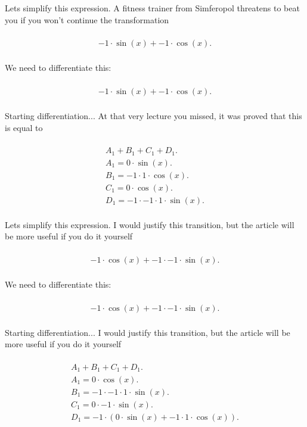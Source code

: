 \documentclass[12pt,a4paper]{extreport}
\begin{document}
Lets simplify this expression.
A fitness trainer from Simferopol\cite{SJ} threatens to beat you if you won't continue the transformation 

\begin{multline}
\\
-1 \cdot \sin(x) + -1 \cdot \cos(x).\\
\end{multline}


We need to differentiate this:


\begin{multline}
\\
-1 \cdot \sin(x) + -1 \cdot \cos(x).\\
\end{multline}


Starting differentiation... 
At that very lecture you missed, it was proved that this is equal to 

\begin{multline}
\\
A_{1} + B_{1} + C_{1} + D_{1}.\\
A_{1} = 0 \cdot \sin(x).\\
B_{1} = -1 \cdot 1 \cdot \cos(x).\\
C_{1} = 0 \cdot \cos(x).\\
D_{1} = -1 \cdot -1 \cdot 1 \cdot \sin(x).\\
\end{multline}


Lets simplify this expression.
I would justify this transition, but the article will be more useful if you do it yourself 

\begin{multline}
\\
-1 \cdot \cos(x) + -1 \cdot -1 \cdot \sin(x).\\
\end{multline}


We need to differentiate this:


\begin{multline}
\\
-1 \cdot \cos(x) + -1 \cdot -1 \cdot \sin(x).\\
\end{multline}


Starting differentiation... 
I would justify this transition, but the article will be more useful if you do it yourself 

\begin{multline}
\\
A_{1} + B_{1} + C_{1} + D_{1}.\\
A_{1} = 0 \cdot \cos(x).\\
B_{1} = -1 \cdot -1 \cdot 1 \cdot \sin(x).\\
C_{1} = 0 \cdot -1 \cdot \sin(x).\\
D_{1} = -1 \cdot (0 \cdot \sin(x) + -1 \cdot 1 \cdot \cos(x)).\\
\end{multline}
\end{document}
